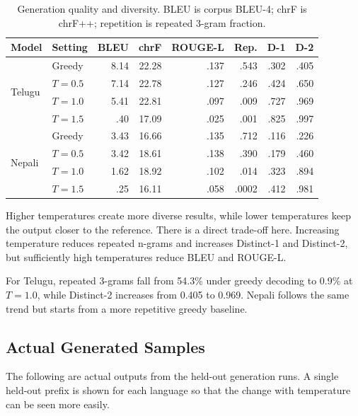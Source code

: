 \documentclass[10pt,a4paper]{article}
\begin{document}
\begin{table}[H]
\centering
\scriptsize
\caption{Generation quality and diversity. BLEU is corpus BLEU-4;
chrF is chrF++; repetition is repeated 3-gram fraction.}
\begin{tabular}{llrrrrrr}
\toprule
Model & Setting & BLEU & chrF & ROUGE-L &
Rep. & D-1 & D-2\\
\midrule
\multirow{4}{*}{Telugu}
& Greedy & 8.14 & 22.28 & .137 & .543 & .302 & .405\\
& $T=0.5$ & 7.14 & 22.78 & .127 & .246 & .424 & .650\\
& $T=1.0$ & 5.41 & 22.81 & .097 & .009 & .727 & .969\\
& $T=1.5$ & .40 & 17.09 & .025 & .001 & .825 & .997\\
\midrule
\multirow{4}{*}{Nepali}
& Greedy & 3.43 & 16.66 & .135 & .712 & .116 & .226\\
& $T=0.5$ & 3.42 & 18.61 & .138 & .390 & .179 & .460\\
& $T=1.0$ & 1.62 & 18.92 & .102 & .014 & .323 & .894\\
& $T=1.5$ & .25 & 16.11 & .058 & .0002 & .412 & .981\\
\bottomrule
\end{tabular}
\end{table}

Higher temperatures create more diverse results, while lower
temperatures keep the output closer to the reference. There is a
direct trade-off here. Increasing temperature reduces repeated
n-grams and increases Distinct-1 and Distinct-2, but sufficiently
high temperatures reduce BLEU and ROUGE-L.

For Telugu, repeated 3-grams fall from 54.3\% under greedy decoding
to 0.9\% at $T=1.0$, while Distinct-2 increases from 0.405 to 0.969.
Nepali follows the same trend but starts from a more repetitive
greedy baseline.

\subsection{Actual Generated Samples}

The following are actual outputs from the held-out generation runs.
A single held-out prefix is shown for each language so that the
change with temperature can be seen more easily.
\end{document}
